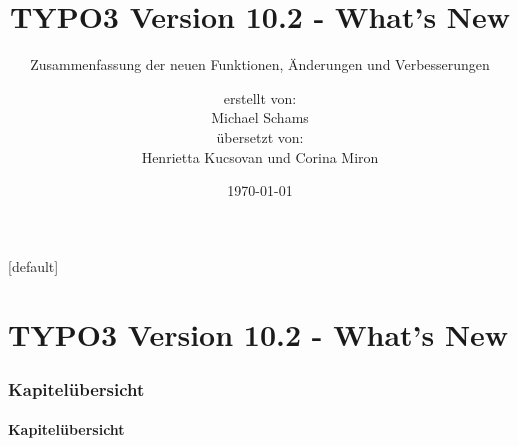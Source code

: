 \documentclass[t]{beamer}
\title{TYPO3 Version 10.2 - What's New}
\subtitle{Zusammenfassung der neuen Funktionen, Änderungen und Verbesserungen}
\author{
	\centerline{erstellt von:}
	\centerline{Michael Schams}
	\centerline{übersetzt von:}
	\centerline{Henrietta Kucsovan und Corina Miron}
}
\date{\today}
\begin{document}
\sharefont


\begingroup
	[default]
	\begin{frame}
		\titlepage
	\end{frame}
\endgroup


\section*{TYPO3 Version 10.2 - What's New}
\begin{frame}[fragile]
	\frametitle{Kapitelübersicht}
	\framesubtitle{Kapitelübersicht}

	\tableofcontents

\end{frame}











%

\end{document}
